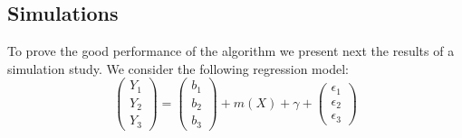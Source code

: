 \documentclass[sn-mathphys]{sn-jnl}%
\theoremstyle{thmstyleone}%
\theoremstyle{thmstyletwo}%
\theoremstyle{thmstylethree}%
\begin{document}
\subsection{Simulations}\label{sec:simu}
To prove the good performance of the algorithm we present next the results of a simulation study. We consider the following regression model:
\begin{equation}\label{eq:model}
	\left(\begin{array}{c}
		Y_{1} \\
		Y_2 \\
		Y_3 \end{array}\right) =
	\left(\begin{array}{c}
		b_{1} \\
		b_2 \\
		b_3 \end{array}\right) +m(X) + \gamma + \left(\begin{array}{c}
		\epsilon_{1} \\
		\epsilon_2 \\
		\epsilon_3 \end{array}\right)
\end{equation}
\end{document}
